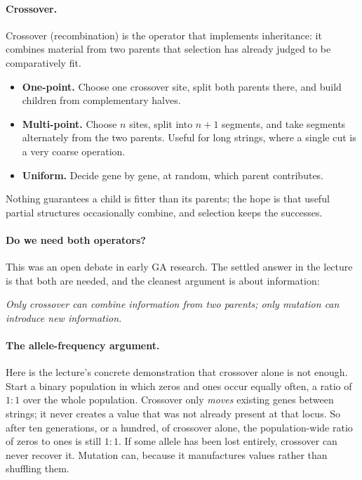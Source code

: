 \documentclass[11pt,a4paper]{article}
\begin{document}
\paragraph{Crossover.}
Crossover (recombination) is the operator that implements inheritance: it
combines material from two parents that selection has already judged to be
comparatively fit.
\begin{itemize}
\item \textbf{One-point.} Choose one crossover site, split both parents
      there, and build children from complementary halves.
\item \textbf{Multi-point.} Choose $n$ sites, split into $n+1$ segments, and
      take segments alternately from the two parents. Useful for long
      strings, where a single cut is a very coarse operation.
\item \textbf{Uniform.} Decide gene by gene, at random, which parent
      contributes.
\end{itemize}
Nothing guarantees a child is fitter than its parents; the hope is that
useful partial structures occasionally combine, and selection keeps the
successes.

\paragraph{Do we need both operators?}
This was an open debate in early GA research. The settled answer in the
lecture is that both are needed, and the cleanest argument is about
information:
\begin{center}
\emph{Only crossover can combine information from two parents; only mutation
can introduce new information.}
\end{center}

\paragraph{The allele-frequency argument.}
Here is the lecture's concrete demonstration that crossover alone is not
enough. Start a binary population in which zeros and ones occur equally often,
a ratio of $1:1$ over the whole population. Crossover only \emph{moves}
existing genes between strings; it never creates a value that was not already
present at that locus. So after ten generations, or a hundred, of crossover
alone, the population-wide ratio of zeros to ones is still $1:1$. If some
allele has been lost entirely, crossover can never recover it. Mutation can,
because it manufactures values rather than shuffling them.
\end{document}
